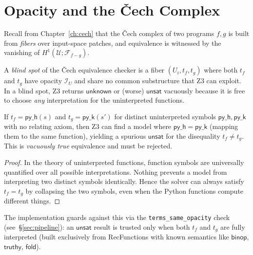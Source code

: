\section{Opacity and the \v{C}ech Complex}
\label{sec:opacity-cech}

Recall from Chapter~\ref{ch:cech} that the \v{C}ech complex of two
programs $f, g$ is built from \emph{fibers} over input-space
patches, and equivalence is witnessed by the vanishing of
$H^1(\mathcal{U}; \mathcal{F}_{f-g})$.

\begin{definition}
\label{def:blind-spot}
A \emph{blind spot} of the \v{C}ech equivalence checker is a fiber
$(U_i, t_f, t_g)$ where both $t_f$ and $t_g$ have opacity
$\mathcal{I}_U$ and share no common substructure that Z3 can
exploit.  In a blind spot, Z3 returns $\mathsf{unknown}$ or
(worse) $\mathsf{unsat}$ vacuously because it is free to choose
\emph{any} interpretation for the uninterpreted functions.
\end{definition}

\begin{theorem}
\label{thm:vacuous-equiv}
If $t_f = \mathsf{py\_h}(s)$ and $t_g = \mathsf{py\_k}(s')$ for
distinct uninterpreted symbols $\mathsf{py\_h}, \mathsf{py\_k}$
with no relating axiom, then Z3 can find a model where
$\mathsf{py\_h} = \mathsf{py\_k}$ (mapping them to the same
function), yielding a spurious $\mathsf{unsat}$ for the
disequality $t_f \neq t_g$.
This is \emph{vacuously true} equivalence and must be rejected.
\end{theorem}

\begin{proof}
In the theory of uninterpreted functions, function symbols are
universally quantified over all possible interpretations.
Nothing prevents a model from interpreting two distinct symbols
identically.  Hence the solver can always satisfy $t_f = t_g$
by collapsing the two symbols, even when the Python functions
compute different things.
\end{proof}

The implementation guards against this via the
\texttt{terms\_same\_opacity} check (see~\S\ref{sec:pipeline}):
an $\mathsf{unsat}$ result is trusted only when both $t_f$ and
$t_g$ are fully interpreted (built exclusively from RecFunctions
with known semantics like $\mathsf{binop}$, $\mathsf{truthy}$,
$\mathsf{fold}$).

